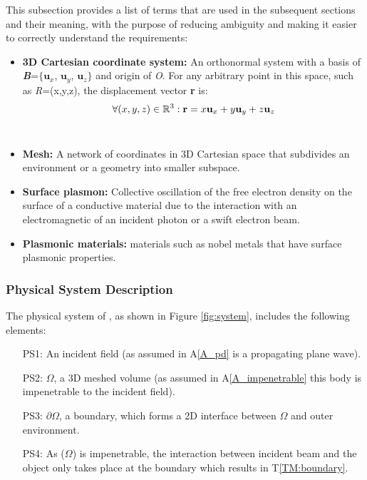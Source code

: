 \documentclass[12pt]{article}
\begin{document}
	
	This subsection provides a list of terms that are used in the subsequent
	sections and their meaning, with the purpose of reducing ambiguity and making it
	easier to correctly understand the requirements:
	
	\begin{itemize} \item \textbf{3D Cartesian coordinate system:} An orthonormal
		system with a basis of \textbf{\textit{B}}=$\{$$\textbf{u}_x$, $\textbf{u}_y$,
		$\textbf{u}_z$$\}$ and origin of \textit{O}. For any arbitrary point in this
		space, such as \textit{R}=(x,y,z), the displacement vector \textbf{r} is: \\
		
		\begin{equation} \label{eq:planewave} \forall (x, y, z) \in \Bbb R^3:
			\textbf{r}= x\textbf{u}_x + y\textbf{u}_y +z\textbf{u}_z \end{equation} \\
		
		\item \textbf{Mesh:} A network of coordinates in 3D Cartesian space that
		subdivides an environment or a geometry into smaller subspace. \item
		\textbf{Surface plasmon:} Collective oscillation of the free electron density on
		the surface of a conductive material due to the interaction with an
		electromagnetic of an incident photon or a swift electron beam. \item
		\textbf{Plasmonic materials:} materials such as nobel metals that have surface
		plasmonic properties.
		
		
	\end{itemize}
	
	
	\subsubsection{Physical System Description} \label{sec_phySystDescrip}

	
	
	The physical system of \progname{}, as shown in Figure \ref{fig:system},
	includes the following elements:
	
	
	\begin{itemize}
		
		\item[PS1:] An incident field (as assumed in A\ref{A_pd} is a propagating plane
		wave).
		
		\item[PS2:] $\Omega$, a 3D meshed volume (as assumed in A\ref{A_impenetrable}
		this body is impenetrable to the incident field).
		
		\item[PS3:] $\partial\Omega$, a boundary, which forms a 2D interface between
		$\Omega$ and outer environment.
		
		
		\item[PS4:] As ($\Omega$) is impenetrable, the interaction between incident beam
		and the object only takes place at the boundary which results in
		T\ref{TM:boundary}. 
	\end{itemize}
	
\end{document}
